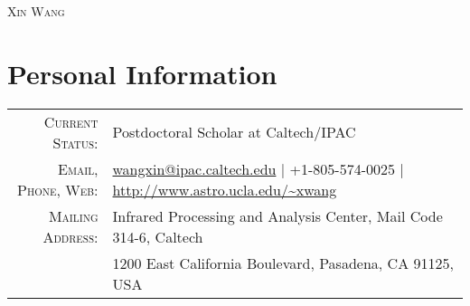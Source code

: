 \documentclass[letterpaper,10pt]{article}
\begin{document}
\par{\centering
  {\Large \textsc{Xin Wang}}
\par}

\vspace*{-.5em}
\section{Personal Information}
\vspace*{1ex}
\begin{tabular}{rl}
    \textsc{Current Status:}  & Postdoctoral Scholar at Caltech/IPAC    \\
    \textsc{Email, Phone, Web:}  & \href{mailto:wangxin@ipac.caltech.edu}{wangxin@ipac.caltech.edu}     |  +1-805-574-0025  |  \url{http://www.astro.ucla.edu/~xwang}\\
    \textsc{Mailing Address:} & Infrared Processing and Analysis Center, Mail Code 314-6, Caltech \\
                              & 1200 East California Boulevard, Pasadena, CA 91125, USA
\end{tabular}


\end{document}
